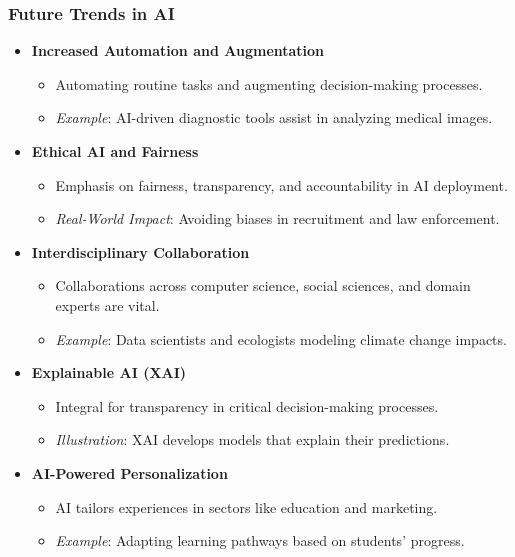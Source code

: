 \documentclass[aspectratio=169]{beamer}
\begin{document}
\begin{frame}[fragile]
    \frametitle{Future Trends in AI}
    \begin{itemize}
        \item \textbf{Increased Automation and Augmentation}
            \begin{itemize}
                \item Automating routine tasks and augmenting decision-making processes.
                \item \textit{Example}: AI-driven diagnostic tools assist in analyzing medical images.
            \end{itemize}
        
        \item \textbf{Ethical AI and Fairness}
            \begin{itemize}
                \item Emphasis on fairness, transparency, and accountability in AI deployment.
                \item \textit{Real-World Impact}: Avoiding biases in recruitment and law enforcement.
            \end{itemize}
        
        \item \textbf{Interdisciplinary Collaboration}
            \begin{itemize}
                \item Collaborations across computer science, social sciences, and domain experts are vital.
                \item \textit{Example}: Data scientists and ecologists modeling climate change impacts.
            \end{itemize}
        
        \item \textbf{Explainable AI (XAI)}
            \begin{itemize}
                \item Integral for transparency in critical decision-making processes.
                \item \textit{Illustration}: XAI develops models that explain their predictions.
            \end{itemize}
        
        \item \textbf{AI-Powered Personalization}
            \begin{itemize}
                \item AI tailors experiences in sectors like education and marketing.
                \item \textit{Example}: Adapting learning pathways based on students' progress.
            \end{itemize}
    \end{itemize}
\end{frame}
\end{document}
